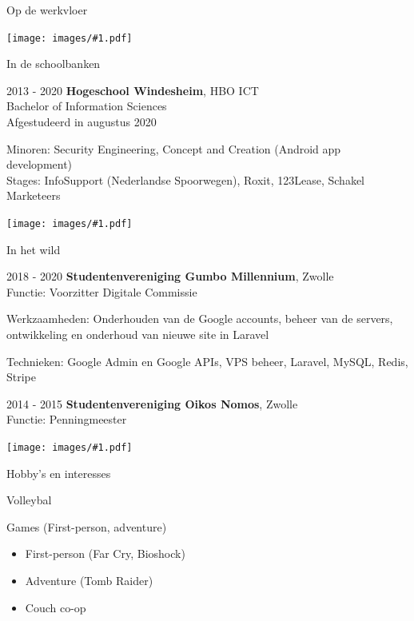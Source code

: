 \documentclass[12pt, a4paper]{article}
\newcommand*{\pdficon}[1]{
    \vspace{10mm}
    \hspace*{-25mm}
    \texttt{[image: images/\#1.pdf]}
    \vspace{-12mm}
}
\begin{document}
\begin{cv}{}
\begin{cvlist}{Op de werkvloer}
        \end{cvlist}

        \pdficon{school}
        \begin{cvlist}{In de schoolbanken}

            \item[2013 - 2020]  \textbf{Hogeschool Windesheim}, HBO ICT \\
                                Bachelor of Information Sciences \\
                                Afgestudeerd in augustus 2020

                                Minoren: Security Engineering, Concept and Creation (Android app development) \\
                                Stages: InfoSupport (Nederlandse Spoorwegen), Roxit, 123Lease, Schakel Marketeers

        \end{cvlist}

        \pdficon{wild}
        \begin{cvlist}{In het wild}

            \item[2018 - 2020]  \textbf{Studentenvereniging Gumbo Millennium}, Zwolle \\
                                Functie: Voorzitter Digitale Commissie

                                Werkzaamheden:
                                Onderhouden van de Google accounts, beheer van de servers, ontwikkeling en onderhoud van nieuwe
                                site in Laravel

                                Technieken: Google Admin en Google APIs, VPS beheer, Laravel, MySQL, Redis, Stripe

            \item[2014 - 2015]  \textbf{Studentenvereniging Oikos Nomos}, Zwolle \\
                                Functie: Penningmeester

        \end{cvlist}

        \pdficon{volley}
        \begin{cvlist}{Hobby's en interesses}

            \item Volleybal

            \item Games (First-person, adventure)
            \begin{itemize}
                \item First-person (Far Cry, Bioshock)
                \item Adventure (Tomb Raider)
                \item Couch co-op
            \end{itemize}


\end{cvlist}
\end{cv}
\end{document}
